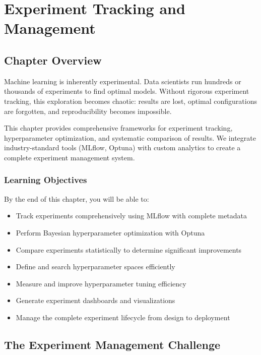 \chapter{Experiment Tracking and Management}
\label{ch:experiment_tracking}

\section{Chapter Overview}

Machine learning is inherently experimental. Data scientists run hundreds or thousands of experiments to find optimal models. Without rigorous experiment tracking, this exploration becomes chaotic: results are lost, optimal configurations are forgotten, and reproducibility becomes impossible.

This chapter provides comprehensive frameworks for experiment tracking, hyperparameter optimization, and systematic comparison of results. We integrate industry-standard tools (MLflow, Optuna) with custom analytics to create a complete experiment management system.

\subsection{Learning Objectives}

By the end of this chapter, you will be able to:

\begin{itemize}
    \item Track experiments comprehensively using MLflow with complete metadata
    \item Perform Bayesian hyperparameter optimization with Optuna
    \item Compare experiments statistically to determine significant improvements
    \item Define and search hyperparameter spaces efficiently
    \item Measure and improve hyperparameter tuning efficiency
    \item Generate experiment dashboards and visualizations
    \item Manage the complete experiment lifecycle from design to deployment
\end{itemize}

\section{The Experiment Management Challenge}

